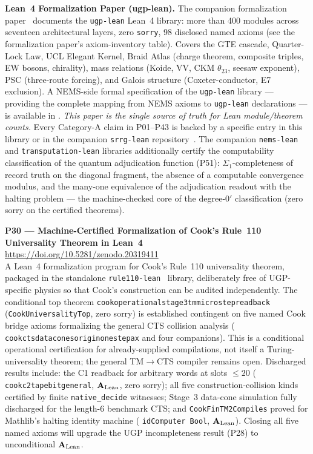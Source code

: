 \documentclass[11pt]{article}
\newcommand{\lean}[1]{%
  \penalty-100
  \begingroup\def\_{{\textunderscore\allowbreak}}\texttt{#1}\endgroup}
\newcommand{\CatAL}{\ensuremath{\textbf{A}_{\rm Lean}}}
\begin{document}
\medskip
\noindent\textbf{Lean~4 Formalization Paper (ugp-lean).}
The companion formalization paper~\cite{SpivackUGPFormalization} documents the
\texttt{ugp-lean} Lean~4 library: more than 400 modules across seventeen architectural
layers, zero \texttt{sorry}, 98 disclosed named axioms (see the formalization paper's
axiom-inventory table).  Covers the GTE
cascade, Quarter-Lock Law, UCL Elegant Kernel, Braid Atlas (charge theorem,
composite triples, EW bosons, chirality), mass relations (Koide, VV, CKM
$\theta_{23}$, seesaw exponent), PSC (three-route forcing), and Galois structure
(Coxeter-conductor, E7 exclusion).
A NEMS-side formal specification of the \texttt{ugp-lean} library --- providing the
complete mapping from NEMS axioms to \texttt{ugp-lean} declarations --- is available
in \cite{SpivackUGPFormalization}.
\emph{This paper is the single source of truth for Lean module/theorem counts.}
Every Category-A claim in P01--P43 is backed by a specific entry in this library or
in the companion \texttt{srrg-lean} repository~\cite{srrg-lean}.
The companion \texttt{nems-lean} and \texttt{transputation-lean} libraries
additionally certify the computability classification of the quantum adjudication
function (P51): $\Sigma_1$-completeness of record truth on the diagonal fragment,
the absence of a computable convergence modulus, and the many-one equivalence of
the adjudication readout with the halting problem --- the machine-checked core of
the degree-$0'$ classification (zero sorry on the certified theorems).

\medskip
\noindent\textbf{P30 — Machine-Certified Formalization of Cook's Rule~110
Universality Theorem in Lean~4}~\cite{SpivackCookTheorem}\\
\url{https://doi.org/10.5281/zenodo.20319411}\\
A Lean~4 formalization program for Cook's Rule~110 universality theorem, packaged
in the standalone \texttt{rule110-lean}~\cite{rule110-lean} library, deliberately
free of UGP-specific physics so that Cook's construction can be audited independently.
The conditional top theorem \lean{cook\_operational\_stage3\_tm\_microstep\_readback}
(\texttt{CookUniversalityTop}, zero sorry) is established contingent on five named
Cook bridge axioms formalizing the general CTS collision analysis
(\lean{cook\_cts\_data\_cones\_origin\_one\_step\_ax} and four companions).  This is
a conditional operational certification for already-supplied compilations, not
itself a Turing-universality theorem; the general TM$\to$CTS compiler remains open.
Discharged results include: the C1 readback for arbitrary words at slots $\le 20$
(\lean{cook\_c2\_tape\_bit\_general}, $\CatAL$, zero sorry); all five
construction-collision kinds certified by finite \texttt{native\_decide} witnesses;
Stage~3 data-cone simulation fully discharged for the length-6 benchmark CTS;
and \lean{CookFinTM2Compiles} proved for Mathlib's halting identity machine
(\lean{idComputer Bool}, $\CatAL$).  Closing all five named axioms will upgrade
the UGP incompleteness result (P28) to unconditional $\CatAL$.
\end{document}
